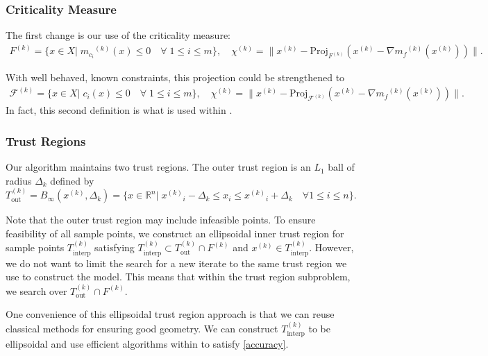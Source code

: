 \documentclass{article}
\theoremstyle{case}
\newcommand{\modelk}{{{m}_f}^{(k)}}
\newcommand{\modelconstrainti}{{{m}_{c_i}}^{(k)}}
\newcommand{\iteratek}{{x}^{(k)}}
\newcommand{\outertrk}{{T_{\text{out}}^{(k)}}}
\newcommand{\sampletrk}{{T_{\text{interp}}^{(k)}}}
\newcommand{\feasiblek}{{F}^{(k)}}
\newcommand{\chik}{{\chi^{(k)}}}
\newcommand{\dk}{\Delta_k}
\begin{document}
\subsubsection{Criticality Measure}

The first change is our use of the criticality measure:
\begin{align*}
\feasiblek = \{x \in X | \; \modelconstrainti(x) \le 0 \quad \forall \; 1 \le i \le m \}, \quad
\chik = \|\iteratek - \text{Proj}_{\feasiblek}(\iteratek - \nabla \modelk(\iteratek))\|.
\end{align*}

With well behaved, known constraints, this projection could be strengthened to
\begin{align*}
{\mathcal F}^{(k)} = \{x \in X | \; c_i(x) \le 0 \quad \forall \; 1 \le i \le m \}, \quad
\chik = \|\iteratek - \text{Proj}_{{\mathcal F}^{(k)}}(\iteratek- \nabla \modelk(\iteratek))\|.
\end{align*}
In fact, this second definition is what is used within \cite{doi:10.1080/10556788.2015.1026968}.



\subsubsection{Trust Regions}
Our algorithm maintains two trust regions.
The outer trust region is an $L_1$ ball of radius $ \dk $ defined by
\begin{equation}
\label{trust_region}
\outertrk = B_{\infty}(\iteratek,\dk) = \{x\in \mathbb R^n | \; {\iteratek}_i - \dk \le x_i \le {\iteratek}_i + \dk \quad \forall 1\le i \le n\}.
\end{equation}

Note that the outer trust region may include infeasible points.
To ensure feasibility of all sample points, we construct an ellipsoidal inner trust region for sample points $ \sampletrk $  satisfying 
$\sampletrk \subset \outertrk \cap \feasiblek$ and $\iteratek \in \sampletrk $.
However, we do not want to limit the search for a new iterate to the same trust region we use to construct the model.
This means that within the trust region subproblem, we search over $\outertrk \cap \feasiblek$.

One convenience of this ellipsoidal trust region approach is that we can reuse classical methods for ensuring good geometry.
We can construct $\sampletrk$ to be ellipsoidal and use efficient algorithms within \cite{DUMMY:intro_book} to satisfy \cref{accuracy}.
\end{document}

